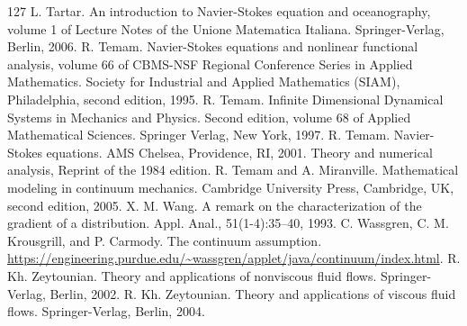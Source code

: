\begin{thebibliography}{127}
 L. Tartar. An introduction to Navier-Stokes equation and oceanography, volume 1 of Lecture Notes of the Unione Matematica Italiana. Springer-Verlag, Berlin, 2006.
 R. Temam. Navier-Stokes equations and nonlinear functional analysis, volume 66 of CBMS-NSF Regional Conference Series in Applied Mathematics. Society for Industrial and Applied Mathematics (SIAM), Philadelphia, second edition, 1995.
 R. Temam. Infinite Dimensional Dynamical Systems in Mechanics and Physics. Second edition, volume 68 of Applied Mathematical Sciences. Springer Verlag, New York, 1997.
 R. Temam. Navier-Stokes equations. AMS Chelsea, Providence, RI, 2001. Theory and numerical analysis, Reprint of the 1984 edition.
 R. Temam and A. Miranville. Mathematical modeling in continuum mechanics. Cambridge University Press, Cambridge, UK, second edition, 2005.
 X. M. Wang. A remark on the characterization of the gradient of a distribution. Appl. Anal., 51(1-4):35–40, 1993.
 C. Wassgren, C. M. Krousgrill, and P. Carmody. The continuum assumption. \url{https://engineering.purdue.edu/~wassgren/applet/java/continuum/index.html}.
 R. Kh. Zeytounian. Theory and applications of nonviscous fluid flows. Springer-Verlag, Berlin, 2002.
 R. Kh. Zeytounian. Theory and applications of viscous fluid flows. Springer-Verlag, Berlin, 2004.
\end{thebibliography}
